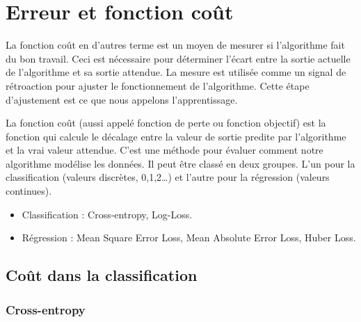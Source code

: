 	
	 
	\section{Erreur et fonction coût}
		La fonction coût en d'autres terme est un moyen de mesurer si l'algorithme fait du bon travail. Ceci est nécessaire pour déterminer l'écart entre la sortie actuelle de l'algorithme et sa sortie attendue. La mesure est utilisée comme un signal de rétroaction pour ajuster le fonctionnement de l'algorithme. Cette étape d'ajustement est ce que nous appelons l'apprentissage.
		
		La fonction coût (aussi appelé fonction de perte ou fonction objectif) est la fonction qui calcule le décalage entre la valeur de sortie predite par l'algorithme et la vrai valeur attendue. C'est une méthode pour évaluer comment notre algorithme modélise les données. Il peut être classé en deux groupes. L'un pour la classification (valeurs discrètes, 0,1,2…) et l'autre pour la régression (valeurs continues).
		\begin{itemize}
			\item Classification :  Cross-entropy, Log-Loss.
			\item Régression :  Mean Square Error Loss, Mean Absolute Error Loss, Huber Loss.
		\end{itemize}
		
			
	\subsection{Coût dans la classification}
		\subsubsection{\textbf{Cross-entropy}}
		
		
		
